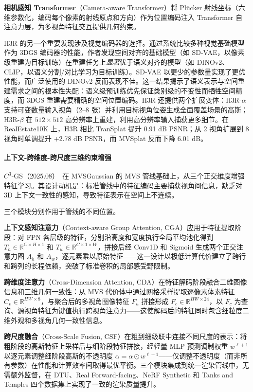 \textbf{相机感知 Transformer}（Camera-aware Transformer）将 Pl\"ucker 射线坐标（六维参数化，编码每个像素的射线原点和方向）作为位置编码注入 Transformer 自注意力层，为多视角特征交互提供几何约束。

H3R 的另一个重要发现涉及视觉编码器的选择。通过系统比较多种视觉基础模型作为 3DGS 编码器的性能，作者发现空间对齐的基础模型（如 SD-VAE，以像素级重建为目标训练）在重建任务上\emph{显著}优于语义对齐的模型（如 DINOv2、CLIP，以语义分割/对比学习为目标训练）。SD-VAE 以更少的参数量实现了更优性能，而广泛使用的 DINOv2 反而表现不佳。这一结果揭示了语义表示与空间重建需求之间的根本性失配：语义级预训练优先保证类别级的不变性而牺牲空间精度，而 3DGS 重建需要精确的空间位置编码。H3R 还提供两个扩展变体：H3R-$\alpha$ 支持可变数量输入视角（2--8 张）并利用目标视角位姿生成全面覆盖场景的高斯；H3R-$\beta$ 在 $512 \times 512$ 高分辨率上重建，利用高分辨率输入捕获更多细节。在 RealEstate10K 上，H3R 相比 TranSplat 提升 0.91 dB PSNR；从 2 视角扩展到 8 视角时单调提升 +2.78 dB PSNR，而 MVSplat 反而下降 6.01 dB。

\paragraph{上下文-跨维度-跨尺度三维约束增强}

$C^3$-GS（2025.08）~\cite{2508_20754}在 MVSGaussian 的 MVS 管线基础上，从三个正交维度增强特征学习。其设计动机是：标准管线中的特征编码主要捕获视角间信息，缺乏对 3D 上下文一致性的感知，导致特征表示在空间上不连续。

三个模块分别作用于管线的不同位置。

\textbf{上下文感知注意力}（Context-aware Group Attention, CGA）应用于特征提取阶段：对 FPN 各层级的特征，分别沿高度和宽度执行全局平均池化得到 $T_h \in \mathbb{R}^{C \times H \times 1}$ 和 $T_w \in \mathbb{R}^{C \times 1 \times W}$，拼接后经 Conv1D 和 Sigmoid 生成两个正交注意力图 $A_h$ 和 $A_w$，逐元素乘以原始特征——这一设计以极低计算代价建立了跨行和跨列的长程依赖，突破了标准卷积的局部感受野限制。

\textbf{跨维度注意力}（Cross-Dimension Attention, CDA）在特征解码阶段融合二维图像信息和三维几何一致性：从 MVS 代价体中通过网格采样提取逐像素体素特征 $C_v \in \mathbb{R}^{HW \times 8}$，与聚合后的多视角图像特征 $F_u$ 拼接形成 $F_c \in \mathbb{R}^{HW \times 24}$，以 $F_c$ 为查询、源视角特征为键值执行跨视角注意力——这使解码后的特征同时包含细粒度二维外观和多视角几何一致性信息。

\textbf{跨尺度融合}（Cross-Scale Fusion, CSF）在粗到细级联中连接不同尺度的表示：将粗阶段的高斯特征上采样后与细阶段特征拼接，经轻量 MLP 预测调制权重 $w^{\ell+1}$ 以逐元素调整细阶段高斯的不透明度 $\alpha = \alpha \odot w^{\ell+1}$——仅调整不透明度（而非所有参数）在性能和计算效率间取得最优平衡。三个模块集成到统一渲染管线中，无需额外监督，在 DTU、Real Forward-facing、NeRF Synthetic 和 Tanks and Temples 四个数据集上实现了一致的渲染质量提升。

